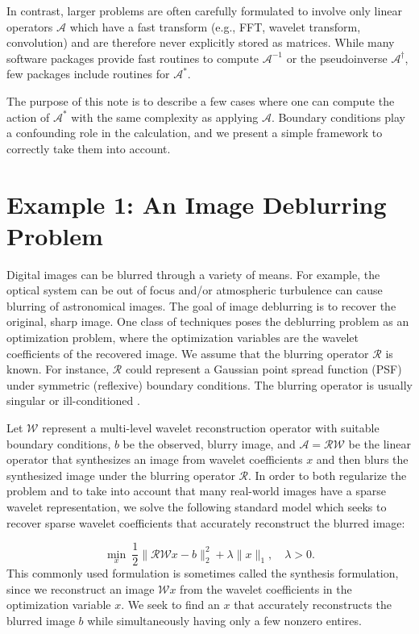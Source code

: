 \documentclass[journal]{IEEEtran}
\newcommand{\A}{\mathcal{A}}
\begin{document}
In contrast, larger problems are often carefully formulated to involve only linear operators $\A$ which have a fast transform (e.g., FFT, wavelet transform, convolution) and are therefore never explicitly stored as matrices.  While many software packages provide fast routines to compute $\A^{-1}$ or the pseudoinverse $\A^\dagger$, few packages include routines for $\A^*$.

The purpose of this note is to describe a few cases where one can compute the action of $\A^*$ with the same complexity as applying $\A$. Boundary conditions play a confounding role in the calculation, and we present a simple framework to correctly take them into account.


\section{Example 1: An Image Deblurring Problem}
Digital images can be blurred through a variety of means.  For example, the optical system can be out of focus and/or atmospheric turbulence can cause blurring of astronomical images.  The goal of image deblurring is to recover the original, sharp image. One class of techniques poses the deblurring problem  as an optimization problem, where the optimization variables are the wavelet coefficients of the recovered image.  We assume  that the blurring operator $\mathcal{R}$ is known. For instance, $\mathcal{R}$ could represent a Gaussian point spread function (PSF) under symmetric (reflexive) boundary conditions. The blurring operator is usually singular or ill-conditioned \cite{hansen_2006}.

Let $\mathcal{W}$ represent a multi-level wavelet reconstruction operator with suitable boundary conditions, $b$ be the observed, blurry image, and $\mathcal{A}=\mathcal{RW}$ be the linear operator that synthesizes an image from wavelet coefficients $x$ and then blurs the synthesized image under the blurring operator $\mathcal{R}$.  In order to both regularize the problem and to take into account that many real-world images have a sparse wavelet representation, we solve the following standard model which seeks to recover sparse wavelet coefficients that accurately reconstruct the blurred image:

\begin{equation}
\label{eq:syn_problem}
\min_x~ \dfrac{1}{2}\|\mathcal{RW}x-b\|_2^2 + \lambda \|x\|_1, \quad \lambda>0.
\end{equation}
This commonly used formulation \cite{beck_2009} is sometimes called the synthesis formulation, since we reconstruct an image $\mathcal{W}x$ from the wavelet coefficients in the optimization variable $x$.  We seek to find an $x$ that accurately reconstructs the blurred image $b$ while simultaneously having only a few nonzero entires.
\end{document}
